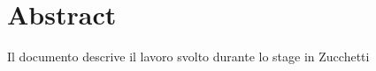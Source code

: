 \cleardoublepage
{}
{}
\begingroup
\let\clearpage\relax
\let\cleardoublepage\relax
\chapter*{Abstract}

Il documento descrive il lavoro svolto durante lo stage in Zucchetti

\endgroup
\vfill
